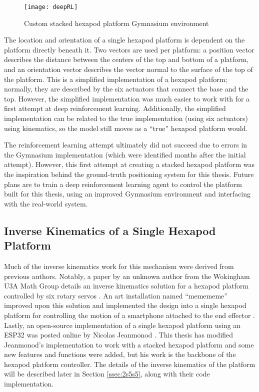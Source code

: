 \documentclass[12pt,a4paper]{report}
\begin{document}
\begin{figure}[htbp]
	\centering
	\texttt{[image: deepRL]}
	\caption{Custom stacked hexapod platform Gymnasium environment \cite{cscpaper}}
	\label{fig:deepRL}
\end{figure}

The location and orientation of a single hexapod platform is dependent on the platform directly beneath it. Two vectors are used per platform: a position vector describes the distance between the centers of the top and bottom of a platform, and an orientation vector describes the vector normal to the surface of the top of the platform. This is a simplified implementation of a hexapod platform; normally, they are described by the six actuators that connect the base and the top. However, the simplified implementation was much easier to work with for a first attempt at deep reinforcement learning. Additionally, the simplified implementation can be related to the true implementation (using six actuators) using kinematics, so the model still moves as a “true” hexapod platform would.

The reinforcement learning attempt ultimately did not succeed due to errors in the Gymnasium implementation (which were identified months after the initial attempt). However, this first attempt at creating a stacked hexapod platform was the inspiration behind the ground-truth positioning system for this thesis. Future plans are to train a deep reinforcement learning agent to control the platform built for this thesis, using an improved Gymnasium environment and interfacing with the real-world system.

\subsection{Inverse Kinematics of a Single Hexapod Platform} \label{ssec:2s1s3}
Much of the inverse kinematics work for this mechanism were derived from previous authors. Notably, a paper by an unknown author from the Wokingham U3A Math Group details an inverse kinematics solution for a hexapod platform controlled by six rotary servos \cite{wokingham}. An art installation named “memememe” improved upon this solution and implemented the design into a single hexapod platform for controlling the motion of a smartphone attached to the end effector \cite{meme}. Lastly, an open-source implementation of a single hexapod platform using an ESP32 was posted online by Nicolas Jeanmonod \cite{nicdoc} \cite{nichub}. This thesis has modified Jeanmonod’s implementation to work with a stacked hexapod platform and some new features and functions were added, but his work is the backbone of the hexapod platform controller. The details of the inverse kinematics of the platform will be described later in Section \ref{ssec:2s5s5}, along with their code implementation.
\end{document}
